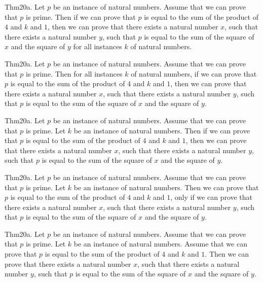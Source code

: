 \documentclass{article}
\begin{document}
Thm20a. Let $p$ be an instance of natural numbers. Assume that we can prove that $p$ is prime. Then if we can prove that $p$ is equal to the sum of the product of $4$ and $k$ and $1$, then we can prove that there exists a natural number $x$, such that there exists a natural number $y$, such that $p$ is equal to the sum of the square of $x$ and the square of $y$ for all instances $k$ of natural numbers.

Thm20a. Let $p$ be an instance of natural numbers. Assume that we can prove that $p$ is prime. Then for all instances $k$ of natural numbers, if we can prove that $p$ is equal to the sum of the product of $4$ and $k$ and $1$, then we can prove that there exists a natural number $x$, such that there exists a natural number $y$, such that $p$ is equal to the sum of the square of $x$ and the square of $y$.

Thm20a. Let $p$ be an instance of natural numbers. Assume that we can prove that $p$ is prime. Let $k$ be an instance of natural numbers. Then if we can prove that $p$ is equal to the sum of the product of $4$ and $k$ and $1$, then we can prove that there exists a natural number $x$, such that there exists a natural number $y$, such that $p$ is equal to the sum of the square of $x$ and the square of $y$.

Thm20a. Let $p$ be an instance of natural numbers. Assume that we can prove that $p$ is prime. Let $k$ be an instance of natural numbers. Then we can prove that $p$ is equal to the sum of the product of $4$ and $k$ and $1$, only if we can prove that there exists a natural number $x$, such that there exists a natural number $y$, such that $p$ is equal to the sum of the square of $x$ and the square of $y$.

Thm20a. Let $p$ be an instance of natural numbers. Assume that we can prove that $p$ is prime. Let $k$ be an instance of natural numbers. Assume that we can prove that $p$ is equal to the sum of the product of $4$ and $k$ and $1$. Then we can prove that there exists a natural number $x$, such that there exists a natural number $y$, such that $p$ is equal to the sum of the square of $x$ and the square of $y$.
\end{document}
